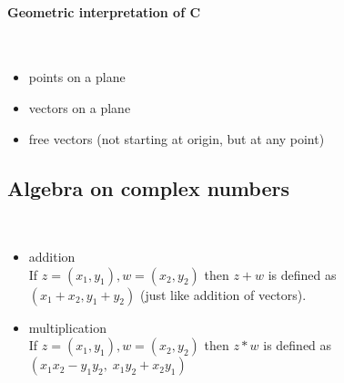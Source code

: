 \documentclass{article}
\begin{document}
\paragraph{Geometric interpretation of C}\mbox{}\\
\begin{itemize}
    \item points on a plane
    \item vectors on a plane
    \item free vectors (not starting at origin, but at any point)
\end{itemize}
\subsection{Algebra on complex numbers}\mbox{}\\
\begin{itemize}
    \item addition\\
    If $z = (x_1, y_1), w = (x_2, y_2)$ then $z + w$ is defined as\\
    $(x_1 + x_2, y_1 + y_2)$ (just like addition of vectors).
    \item multiplication\\
    If $z = (x_1, y_1), w = (x_2, y_2)$ then $z * w$ is defined as\\
    $(x_1 x_2 - y_1 y_2,\;x_1 y_2 + x_2 y_1)$
\end{itemize}
\end{document}
